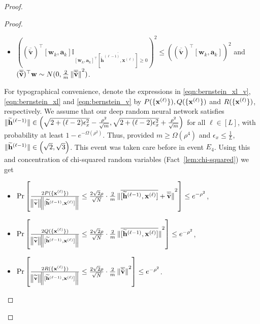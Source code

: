 \begin{proof}
\begin{proof}
\begin{itemize}
			\item $((\overline{\widetilde{\mathbf{v}}})^{\top} [\mathbf{w}_{k}, \mathbf{a}_{k}] \mathbb{I}_{[\mathbf{w}_{k}, \mathbf{a}_{k}]^{\top} \overline{[\widetilde{\mathbf{h}}^{(\ell-1)},  \mathbf{x}^{(\ell)}]} \ge 0} )^2 \leq
			((\overline{\widetilde{\mathbf{v}}})^{\top} [\mathbf{w}_{k}, \mathbf{a}_{k}] )^2$ 
			and $(\overline{\widetilde{\mathbf{v}}})^{\top} \mathbf{w} \sim N(0, \frac{2}{m}\norm[0]{\overline{\widetilde{\mathbf{v}}}}^2)$.
		\end{itemize}
		
		
		For typographical convenience, denote the expressions in \eqref{eqn:bernstein_xl_v}, \eqref{eqn:bernstein_xl} and \eqref{eqn:bernstein_v} by 
		$P(\{\mathbf{x}^{(\ell)}\}), Q(\{\mathbf{x}^{(\ell)}\})$ and $R(\{\mathbf{x}^{(\ell)}\})$, respectively. We assume that our deep random neural network satisfies $\norm[0]{\widetilde{\mathbf{h}}^{(\ell-1)}} \in \left(\sqrt{2 + (\ell - 2)\epsilon_x^2} - \frac{\rho^2}{\sqrt{m}}, \sqrt{2 + (\ell - 2)\epsilon_x^2} + 
		\frac{\rho^2}{\sqrt{m}}\right)$ for all $\ell \in [L]$, with probability at least $1-e^{-\Omega(\rho^2)}$. Thus, provided $m \ge \Omega(\rho^4)$ and $\epsilon_x \le \frac{1}{L}$, $\norm[0]{\widetilde{\mathbf{h}}^{(\ell-1)}} \in \left(\sqrt{2}, \sqrt{3}\right)$.  %
		This event was taken care before in event $E_4$. Using this and concentration of chi-squared random variables
		(Fact~\ref{lem:chi-squared}) we get 
		\begin{itemize}
			\item $\Pr\left[\frac{2P(\{\mathbf{x}^{(\ell)}\})}{\norm{\widetilde{\mathbf{v}}} \norm{[\widetilde{\mathbf{h}}^{(\ell-1)},  \mathbf{x}^{(\ell)}]}} \leq \frac{2\sqrt{2} \rho}{ \sqrt{N} } \cdot \frac{2}{m}\norm[0]{\overline{[\widetilde{\mathbf{h}}^{(\ell-1)},  \mathbf{x}^{(\ell)}]} + \overline{\widetilde{\mathbf{v}}}}^2\right] \leq e^{-\rho^2}$,
			\item $\Pr\left[\frac{2Q(\{\mathbf{x}^{(\ell)}\})}{\norm{\widetilde{\mathbf{v}}} \norm{[\widetilde{\mathbf{h}}^{(\ell-1)},  \mathbf{x}^{(\ell)}]}} \leq \frac{2\sqrt{2} \rho}{ \sqrt{N} } \cdot \frac{2}{m}\norm[0]{\overline{[\widetilde{\mathbf{h}}^{(\ell-1)},  \mathbf{x}^{(\ell)}]}}^2\right] \leq e^{-\rho^2}$,
			\item $\Pr\left[\frac{2R(\{\mathbf{x}^{(\ell)}\})}{\norm{\widetilde{\mathbf{v}}} \norm{[\widetilde{\mathbf{h}}^{(\ell-1)},  \mathbf{x}^{(\ell)}]}} \leq \frac{2\sqrt{2} \rho}{ \sqrt{N} } \cdot \frac{2}{m}\norm[0]{\overline{\widetilde{\mathbf{v}}}}^2\right] \leq e^{-\rho^2}$.
		\end{itemize}
		

\end{proof}
\end{proof}
